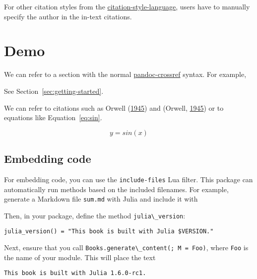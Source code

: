 \documentclass[
  14pt
  american,
  paper=a4,
  ,captions=tableheading
]{scrreprt}
\newcommand{\passthrough}[1]{#1}
\renewenvironment{quote}{\begin{customblockquote}\list{}{\rightmargin=0em\leftmargin=0em}%
\item\relax\color{blockquote-text}\ignorespaces}{\unskip\unskip\endlist\end{customblockquote}}
\begin{document}
For other citation styles from the
\href{https://github.com/citation-style-language/styles}{citation-style-language},
users have to manually specify the author in the in-text citations.

\hypertarget{sec:demo}{%
\chapter{Demo}\label{sec:demo}}

We can refer to a section with the normal
\href{https://lierdakil.github.io/pandoc-crossref/}{pandoc-crossref}
syntax. For example,

\begin{quote}
See Section~\ref{sec:getting-started}.
\end{quote}

We can refer to citations such as Orwell
(\protect\hyperlink{ref-orwell1945animal}{1945}) and (Orwell,
\protect\hyperlink{ref-orwell1945animal}{1945}) or to equations like
Equation~\ref{eq:sin}.

\protect\hypertarget{eq:sin}{}{\begin{equation} y = sin(x) \label{eq:sin}\end{equation}}

\hypertarget{sec:embedding-code}{%
\section{Embedding code}\label{sec:embedding-code}}

For embedding code, you can use the
\passthrough{\lstinline!include-files!} Lua filter. This package can
automatically run methods based on the included filenames. For example,
generate a Markdown file \passthrough{\lstinline!sum.md!} with Julia and
include it with

Then, in your package, define the method
\passthrough{\lstinline!julia\_version!}:

\begin{lstlisting}
julia_version() = "This book is built with Julia $VERSION."
\end{lstlisting}

Next, ensure that you call
\passthrough{\lstinline!Books.generate\_content(; M = Foo)!}, where
\passthrough{\lstinline!Foo!} is the name of your module. This will
place the text

\begin{lstlisting}
This book is built with Julia 1.6.0-rc1.
\end{lstlisting}
\end{document}
